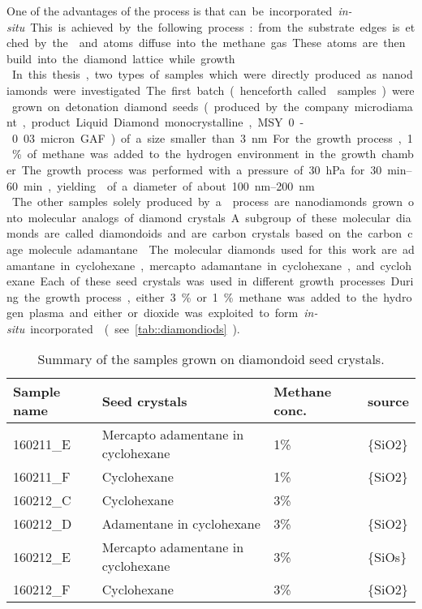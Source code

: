 	One of the advantages of the \CVD process is that \si can be incorporated \textit{in-situ}.
	This is achieved by the following process: \si from the substrate edges is etched by the  and \si atoms diffuse into the methane gas. 
	These atoms are then build into the diamond lattice while growth.
	\\
	In this thesis, two types of samples which were directly produced as nanodiamonds were investigated.
	The first batch (henceforth called \CVD samples) were grown on detonation diamond seeds (produced by the company microdiamant, product Liquid Diamond monocrystalline, MSY 0-0.03 micron GAF) of a size smaller than \SI{3}{nm}.
	For the growth process, 1\% of methane was added to the hydrogen environment in the growth chamber.
	The growth process was performed with a pressure of \SI{30}{hPa} for \SIrange{30}{60}{min}, yielding \nds of a diameter of about \SIrange{100}{200}{nm}.
	\\
	The other samples solely produced by a \CVD process are nanodiamonds grown onto molecular analogs of diamond crystals.
	A subgroup of these molecular diamonds are called diamondoids and are carbon crystals based on the carbon cage molecule adamantane .
	The molecular diamonds used for this work are adamantane in cyclohexane, mercapto adamantane in cyclohexane, and cyclohexane.
	Each of these seed crystals was used in different growth processes.
	During the growth process, either 3\% or 1\% methane was added to the hydrogen plasma and either \si or \si dioxide was exploited to form \textit{in-situ} incorporated \sivs (see \autoref{tab::diamondiods}).


	\begin{table}[tp] 
		\centering 
		\caption{Summary of the samples grown on diamondoid seed crystals.} \label{tab::diamondiods} 
			\begin{tabular}{llll} 
			\toprule
			Sample name & Seed crystals & Methane conc. & \Si source \\ 
			\midrule
			160211\_E & Mercapto adamentane in cyclohexane & 1\% & \ch\{SiO2\} \\
			160211\_F & Cyclohexane                        & 1\% & \ch\{SiO2\} \\
			160212\_C & Cyclohexane                        & 3\% & \si         \\
			160212\_D & Adamentane in cyclohexane          & 3\% & \ch\{SiO2\} \\
			160212\_E & Mercapto adamentane in cyclohexane & 3\% & \ch\{SiOs\} \\
			160212\_F & Cyclohexane                        & 3\% & \ch\{SiO2\}\\
			\bottomrule
			\end{tabular} 
	\end{table}







